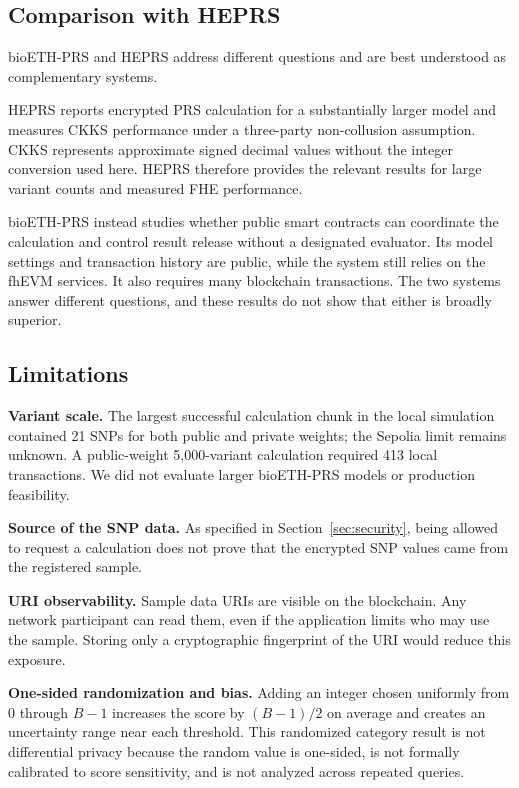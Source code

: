 \documentclass[10pt]{article}
\begin{document}
\subsection{Comparison with HEPRS}

bioETH-PRS and HEPRS \citep{knight2026heprs} address different questions and are best
understood as complementary systems.

HEPRS reports encrypted PRS calculation for a substantially larger model and measures
CKKS performance under a three-party non-collusion assumption.  CKKS represents
approximate signed decimal values without the integer conversion used here.  HEPRS
therefore provides the relevant results for large variant counts and measured FHE
performance.

bioETH-PRS instead studies whether public smart contracts can coordinate the calculation
and control result release without a designated evaluator.  Its model
settings and transaction history are public, while the system still relies on the fhEVM
services.  It also requires many blockchain transactions.  The two systems answer
different questions, and these results do not show that either is broadly superior.

\subsection{Limitations}

\textbf{Variant scale.}
The largest successful calculation chunk in the local simulation contained 21 SNPs for
both public and private weights; the Sepolia limit remains unknown.  A public-weight
5,000-variant calculation required 413 local transactions.  We did not evaluate larger
bioETH-PRS models or production feasibility.

\textbf{Source of the SNP data.}
As specified in Section~\ref{sec:security}, being allowed to request a calculation does
not prove that the encrypted SNP values came from the registered sample.

\textbf{URI observability.}
Sample data URIs are visible on the blockchain.  Any network participant can read them,
even if the application limits who may use the sample.  Storing only a cryptographic
fingerprint of the URI would reduce this exposure.

\textbf{One-sided randomization and bias.}
Adding an integer chosen uniformly from $0$ through $B-1$ increases the score by
$(B-1)/2$ on average and creates an uncertainty range near each threshold.  This
randomized category result is not
differential privacy because the random value is one-sided, is not formally calibrated
to score sensitivity, and is not analyzed across repeated queries.
\end{document}
